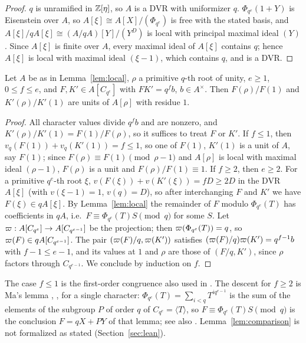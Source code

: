 \begin{proof}
$q$ is unramified in $\mathbb{Z}[\eta]$, so $A$ is a DVR with uniformizer $q$.
$\Phi_{q^e}(1+Y)$ is Eisenstein over $A$, so $A[\xi]\cong
A[X]/(\Phi_{q^e})$ is free with the stated basis, and
$A[\xi]/qA[\xi]\cong(A/qA)[Y]/(Y^D)$ is local with principal maximal
ideal $(Y)$. Since $A[\xi]$ is finite over $A$, every maximal ideal of
$A[\xi]$ contains $q$; hence $A[\xi]$ is local with maximal ideal
$(\xi-1)$, which contains $q$, and is a DVR.
\end{proof}

\begin{lemma}\label{lem:comparison}
Let $A$ be as in Lemma~\ref{lem:local}, $\rho$ a primitive $q$-th root of
unity, $e\ge1$, $0\le f\le e$, and $F,K'\in A[C_{q^e}]$ with
$FK'=q^fb$, $b\in A^\times$. Then $F(\rho)/F(1)$ and $K'(\rho)/K'(1)$
are units of $A[\rho]$ with residue $1$.
\end{lemma}

\begin{proof}
All character values divide $q^fb$ and are nonzero, and
$K'(\rho)/K'(1)=F(1)/F(\rho)$, so it suffices to treat $F$ or $K'$. If
$f\le1$, then $v_q(F(1))+v_q(K'(1))=f\le1$, so one of $F(1)$, $K'(1)$ is
a unit of $A$, say $F(1)$; since $F(\rho)\equiv F(1)\pmod{\rho-1}$ and
$A[\rho]$ is local with maximal ideal $(\rho-1)$, $F(\rho)$ is a unit and
$F(\rho)/F(1)\equiv1$. If $f\ge2$, then $e\ge2$. For a primitive
$q^e$-th root $\xi$, $v(F(\xi))+v(K'(\xi))=fD\ge2D$ in the DVR $A[\xi]$
(with $v(\xi-1)=1$, $v(q)=D$), so after interchanging $F$ and $K'$ we
have $F(\xi)\in qA[\xi]$. By Lemma~\ref{lem:local} the remainder of $F$
modulo $\Phi_{q^e}(T)$ has coefficients in $qA$, i.e.\ $F\equiv
\Phi_{q^e}(T)S\pmod q$ for some $S$. Let $\varpi:A[C_{q^e}]\to
A[C_{q^{e-1}}]$ be the projection; then $\varpi(\Phi_{q^e}(T))=q$, so
$\varpi(F)\in qA[C_{q^{e-1}}]$. The pair $(\varpi(F)/q,\varpi(K'))$ satisfies
$(\varpi(F)/q)\varpi(K')=q^{f-1}b$ with $f-1\le e-1$, and its values at $1$ and
$\rho$ are those of $(F/q,K')$, since $\rho$ factors through
$C_{q^{e-1}}$. We conclude by induction on $f$.
\end{proof}

The case $f\le1$ is the first-order congruence also used in
\cite[Lemma~3.11]{LeungSchmidtZhang2023}. The descent for $f\ge2$ is
Ma's lemma \cite{Ma1985}, \cite[Lemma~3.1]{MaSchmidt1995},
\cite[Result~2.4]{DoDuc2019} for a single character:
$\Phi_{q^e}(T)=\sum_{i<q}T^{iq^{e-1}}$ is the sum of the elements of the
subgroup $P$ of order $q$ of $C_{q^e}=\langle T\rangle$, so $F\equiv
\Phi_{q^e}(T)S\pmod q$ is the conclusion $F=qX+PY$ of that lemma; see
also \cite[Lemma~3.1]{OpenAI2026}. Lemma~\ref{lem:comparison} is not
formalized as stated (Section~\ref{sec:lean}).

